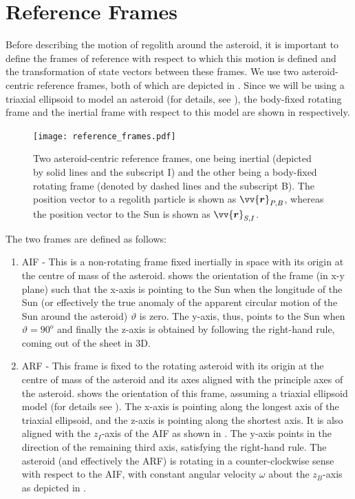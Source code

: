 \section{Reference Frames}
\label{sec:reference_frames}
Before describing the motion of regolith around the asteroid, it is important to define the frames of reference with respect to which this motion is defined and the transformation of state vectors between these frames. We use two asteroid-centric reference frames, both of which are depicted in . Since we will be using a triaxial ellipsoid to model an asteroid (for details, see ), the body-fixed rotating frame and the inertial frame with respect to this model are shown in  respectively.
\begin{figure}[htb]
\centering
\captionsetup{justification=centering}
\texttt{[image: reference\_frames.pdf]}
\caption{Two asteroid-centric reference frames, one being inertial (depicted by solid lines and the subscript I) and the other being a body-fixed rotating frame (denoted by dashed lines and the subscript B). The position vector to a regolith particle is shown as $\protect\vv{\bm{r}}_{P,B}$, whereas the position vector to the Sun is shown as $\protect\vv{\bm{r}}_{S,I}$.}
\label{fig:reference_frame}
\end{figure}
\FloatBarrier
The two frames are defined as follows:
\begin{enumerate}
\item \gls{AIF} - This is a non-rotating frame fixed inertially in space with its origin at the centre of mass of the asteroid.  shows the orientation of the frame (in x-y plane) such that the x-axis is pointing to the Sun when the longitude of the Sun (or effectively the true anomaly of the apparent circular motion of the Sun around the asteroid) $\vartheta$ is zero. The y-axis, thus, points to the Sun when $\vartheta = 90^o$ and finally the z-axis is obtained by following the right-hand rule, coming out of the sheet in 3D.
%
\item \gls{ARF} - This frame is fixed to the rotating asteroid with its origin at the centre of mass of the asteroid and its axes aligned with the principle axes of the asteroid.  shows the orientation of this frame, assuming a triaxial ellipsoid model (for details see ). The x-axis is pointing along the longest axis of the triaxial ellipsoid, and the z-axis is pointing along the shortest axis. It is also aligned with the $z_I$-axis of the \gls{AIF} as shown in . The y-axis points in the direction of the remaining third axis, satisfying the right-hand rule. The asteroid (and effectively the \gls{ARF}) is rotating in a counter-clockwise sense with respect to the \gls{AIF}, with constant angular velocity $\omega$ about the $z_B$-axis as depicted in .
\end{enumerate}
